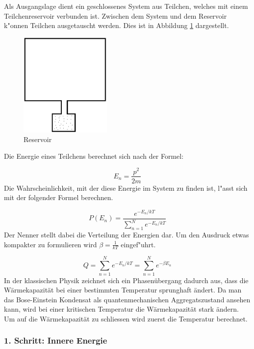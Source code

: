 \begin{refsection}
Als Ausgangslage dient ein geschlossenes System aus Teilchen, welches mit einem Teilchenreservoir verbunden ist. 
Zwischen dem System und dem Reservoir k"onnen Teilchen ausgetauscht werden. Dies ist in Abbildung \ref{fig:reservoir} dargestellt.

\begin{figure}
	\centering
	\includegraphics[width = 0.4\textwidth]{./bose/reservoir.png}
	\caption{Reservoir}
	\label{fig:reservoir}
\end{figure}
Die Energie eines Teilchens berechnet sich nach der Formel:

\begin{equation}
   E_n = \frac{p^2}{2m}
\end{equation}
Die Wahrscheinlichkeit, mit der diese Energie im System zu finden ist, l"asst sich mit der folgender Formel berechnen.

\begin{equation}
    P(E_n) = \frac{e^{-E_n/kT}}{\sum\limits_{n = 1}^{N} e^{-E_n/kT}}    
\end{equation}
Der Nenner stellt dabei die Verteilung der Energien dar. Um den Ausdruck etwas kompakter zu formulieren wird $ \beta = \frac{1}{kT}$ eingef"uhrt.

\begin{equation}
    Q = \sum\limits_{n = 1}^{N} e^{-E_n/kT} = \sum\limits_{n = 1}^{N} e^{-\beta E_n}
\end{equation}
In der klassischen Physik zeichnet sich ein Phasenübergang dadurch aus, dass die Wärmekapazität bei einer bestimmten Temperatur sprunghaft ändert. Da man das Bose-Einstein Kondensat als quantenmechanischen Aggregatszustand ansehen kann, wird bei einer kritischen Temperatur die Wärmekapazität stark ändern. Um auf die Wärmekapazität zu schliessen wird zuerst die Temperatur berechnet.

\subsubsection{1. Schritt: Innere Energie}


\end{refsection}
